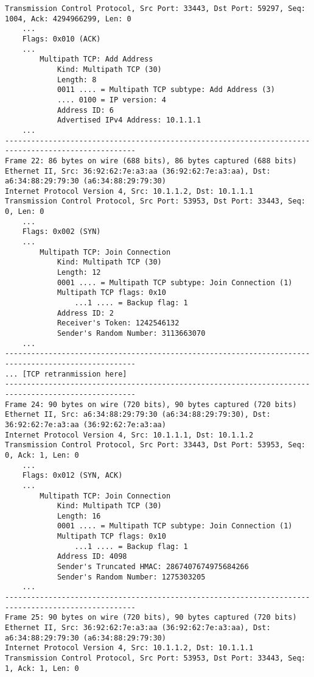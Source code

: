 \begin{verbatim}
Transmission Control Protocol, Src Port: 33443, Dst Port: 59297, Seq: 1004, Ack: 4294966299, Len: 0
    ...
    Flags: 0x010 (ACK)
    ...
        Multipath TCP: Add Address
            Kind: Multipath TCP (30)
            Length: 8
            0011 .... = Multipath TCP subtype: Add Address (3)
            .... 0100 = IP version: 4
            Address ID: 6
            Advertised IPv4 Address: 10.1.1.1
    ...
----------------------------------------------------------------------------------------------------
Frame 22: 86 bytes on wire (688 bits), 86 bytes captured (688 bits)
Ethernet II, Src: 36:92:62:7e:a3:aa (36:92:62:7e:a3:aa), Dst: a6:34:88:29:79:30 (a6:34:88:29:79:30)
Internet Protocol Version 4, Src: 10.1.1.2, Dst: 10.1.1.1
Transmission Control Protocol, Src Port: 53953, Dst Port: 33443, Seq: 0, Len: 0
    ...
    Flags: 0x002 (SYN)
    ...
        Multipath TCP: Join Connection
            Kind: Multipath TCP (30)
            Length: 12
            0001 .... = Multipath TCP subtype: Join Connection (1)
            Multipath TCP flags: 0x10
                ...1 .... = Backup flag: 1
            Address ID: 2
            Receiver's Token: 1242546132
            Sender's Random Number: 3113663070
    ...
----------------------------------------------------------------------------------------------------
... [TCP retranmission here]
----------------------------------------------------------------------------------------------------
Frame 24: 90 bytes on wire (720 bits), 90 bytes captured (720 bits)
Ethernet II, Src: a6:34:88:29:79:30 (a6:34:88:29:79:30), Dst: 36:92:62:7e:a3:aa (36:92:62:7e:a3:aa)
Internet Protocol Version 4, Src: 10.1.1.1, Dst: 10.1.1.2
Transmission Control Protocol, Src Port: 33443, Dst Port: 53953, Seq: 0, Ack: 1, Len: 0
    ...
    Flags: 0x012 (SYN, ACK)
    ...
        Multipath TCP: Join Connection
            Kind: Multipath TCP (30)
            Length: 16
            0001 .... = Multipath TCP subtype: Join Connection (1)
            Multipath TCP flags: 0x10
                ...1 .... = Backup flag: 1
            Address ID: 4098
            Sender's Truncated HMAC: 2867407674975684266
            Sender's Random Number: 1275303205
    ...
----------------------------------------------------------------------------------------------------
Frame 25: 90 bytes on wire (720 bits), 90 bytes captured (720 bits)
Ethernet II, Src: 36:92:62:7e:a3:aa (36:92:62:7e:a3:aa), Dst: a6:34:88:29:79:30 (a6:34:88:29:79:30)
Internet Protocol Version 4, Src: 10.1.1.2, Dst: 10.1.1.1
Transmission Control Protocol, Src Port: 53953, Dst Port: 33443, Seq: 1, Ack: 1, Len: 0

\end{verbatim}
